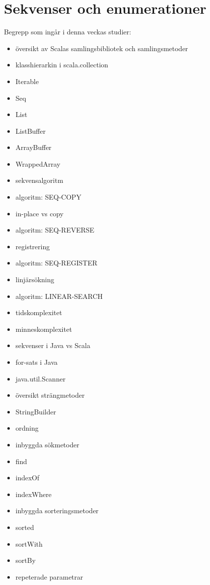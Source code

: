 \chapter{Sekvenser och enumerationer}\label{chapter:W07}
Begrepp som ingår i denna veckas studier:
\begin{multicols}{2}\begin{itemize}[noitemsep,label={$\square$},leftmargin=*]
\item översikt av Scalas samlingsbibliotek och samlingsmetoder
\item klasshierarkin i scala.collection
\item Iterable
\item Seq
\item List
\item ListBuffer
\item ArrayBuffer
\item WrappedArray
\item sekvensalgoritm
\item algoritm: SEQ-COPY
\item in-place vs copy
\item algoritm: SEQ-REVERSE
\item registrering
\item algoritm: SEQ-REGISTER
\item linjärsökning
\item algoritm: LINEAR-SEARCH
\item tidskomplexitet
\item minneskomplexitet
\item sekvenser i Java vs Scala
\item for-sats i Java
\item java.util.Scanner
\item översikt strängmetoder
\item StringBuilder
\item ordning
\item inbyggda sökmetoder
\item find
\item indexOf
\item indexWhere
\item inbyggda sorteringsmetoder
\item sorted
\item sortWith
\item sortBy
\item repeterade parametrar\end{itemize}\end{multicols}
